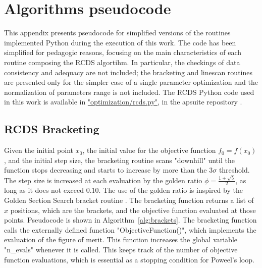 \chapter{Algorithms pseudocode}
\label{chap:pseudocode}
This appendix presents pseudocode for simplified versions of the routines implemented Python during the execution of this work. The code has been simplified for pedagogic reasons, focusing on the main characteristics of each routine composing the RCDS algortihm. In particular, the checkings of data consistency and adequacy are not included; the bracketing and linescan routines are presented only for the simpler case of a single parameter optimization and the normalization of parameters range is not included. The RCDS Python code used in this work is available in \href{https://github.com/lnls-fac/apsuite/blob/master/apsuite/optimization/rcds.py}{"optimization/rcds.py"}, in the apsuite  repository \cite{apsuite}.

\section{RCDS Bracketing}
Given the initial point $x_0$, the initial value for the objective function $f_0 = f(x_0)$, and the initial step size, the bracketing routine scans "downhill" until the function stops decreasing and starts to increase by more than the $3\sigma$ threshold. The step size is increased at each evaluation by the golden ratio $\phi=\frac{1+\sqrt{5}}{2}$, as long as it does not exceed $0.10$. The use of the golden ratio is inspired by the Golden Section Search bracket routine \cite[sec. 10.2]{press_numerical_2007}. The bracketing function returns a list of $x$ positions, which are the brackets, and the objective function evaluated at those points. Pseudocode is shown in Algorithm~\ref{alg:brackets}. The bracketing function calls the externally defined function "ObjectiveFunction()", which implements the evaluation of the figure of merit. This function increases the global variable "n\_evals" whenever it is called. This keeps track of the number of objective function evaluations, which is essential as a stopping condition for Poweel's loop.

